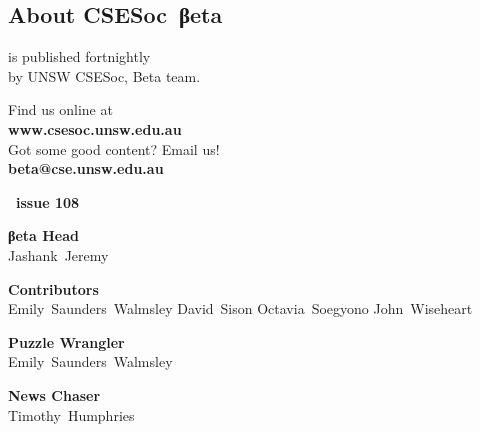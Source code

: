 \documentclass[twoside]{article}
\date{29 July 2015}
\makeatletter
\gdef\the@year{2015}
\gdef\the@issue{108}
\makeatother
\begin{document}
%
\newpage
\maketitle\thispagestyle{mag}
\begin{multicols}{2}\begingroup
\section*{About CSE{}Soc~βeta}\begin{center}
\csesocbeta{} is published fortnightly\\
by UNSW CSESoc, Beta team.
\par Find us online at\\
\textbf{www.csesoc.unsw.edu.au}\\
Got some good content? Email us!\\
\textbf{beta@cse.unsw.edu.au}\\
\vspace{1em}\par
{\Large\bf\makeatletter \the@year\ issue \the@issue}
\par{\bf\sffamily βeta Head}\\ Jashank~Jeremy
\par{\bf\sffamily Contributors}\\
  Emily~Saunders~Walmsley\hsp{}
  David~Sison\hsp{}
  Octavia~Soegyono\hsp{}
  John~Wiseheart\hsp{}
\par{\bf\sffamily Puzzle Wrangler}\\ Emily~Saunders~Walmsley
\par{\bf\sffamily News Chaser}\\ Timothy~Humphries
\end{center}

\vfill\malcontents\raggedcolumns\columnbreak
\endgroup\raggedcolumns


\end{multicols}
\end{document}
